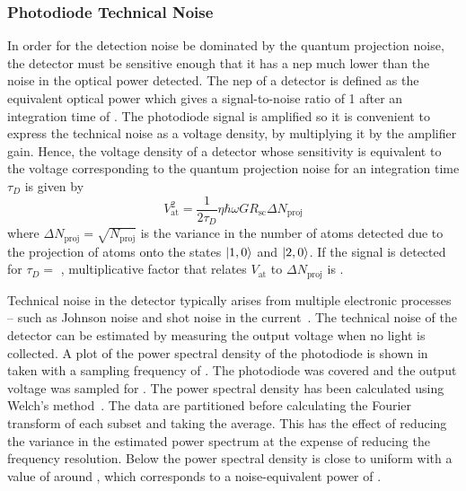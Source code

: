 \subsubsection{Photodiode Technical Noise}
In order for the detection noise
be dominated by the quantum projection noise, the detector must be sensitive
enough that it has a \ac{nep} much lower than the noise in the optical
power detected. The \ac{nep} of a detector is defined as the
equivalent optical power which gives a signal-to-noise ratio of 1
after an integration time of . The photodiode
signal is amplified so it is convenient
to express the technical noise as a voltage density, by multiplying it by the
amplifier gain. Hence, the
voltage density of a detector whose sensitivity is equivalent to the
voltage corresponding to the quantum projection noise for an
integration time \(\tau_D\) is given by
\begin{equation}
  V^2_\text{at} =
  \frac{1}{2\tau_D}\eta \hbar \omega G R_\text{sc}\Delta N_\text{proj}
  \label{eq:nep}
\end{equation}
where $\Delta N_\text{proj} = \sqrt{N_\text{proj}}$ is the variance in
the number of atoms detected due to the projection of atoms onto the
states $\ket{1,0}$ and $\ket{2,0}$. If the signal is detected for $\tau_D =$ ,
multiplicative factor that relates $V_\text{at}$ to
$\Delta N_\text{proj}$ is .
\par\noindent
Technical noise in the detector typically arises from multiple electronic processes -- such as Johnson noise and shot noise in
the current~\cite{Howard2002}. The technical noise of the detector can
be estimated by measuring the output voltage when no light is
collected. A plot of the power spectral density of the photodiode is
shown in~ taken
with a sampling frequency of . The
photodiode was covered and the output voltage was sampled for
. The power spectral density has been calculated
using Welch's method~\cite{Welch1967}. The data are partitioned before
calculating the Fourier transform of each subset and taking the
average. This has the effect of reducing the variance in the estimated
power spectrum at the expense of reducing the frequency resolution.
Below  the power spectral density is close
to uniform with a value of around
, which corresponds to a
noise-equivalent power of .
